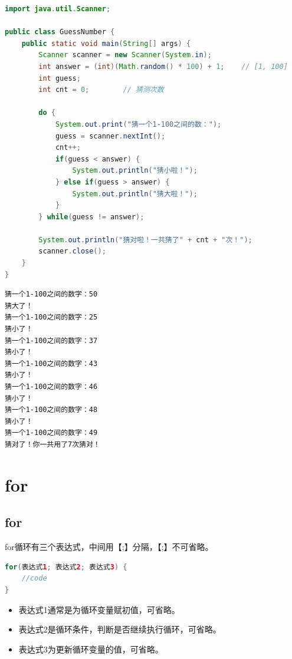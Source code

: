 
\begin{lstlisting}[language=Java]
import java.util.Scanner;

public class GuessNumber {
    public static void main(String[] args) {
        Scanner scanner = new Scanner(System.in);
        int answer = (int)(Math.random() * 100) + 1;    // [1, 100]
        int guess;
        int cnt = 0;        // 猜测次数
        
        do {
            System.out.print("猜一个1-100之间的数：");
            guess = scanner.nextInt();
            cnt++;
            if(guess < answer) {
                System.out.println("猜小啦！");
            } else if(guess > answer) {
                System.out.println("猜大啦！");
            }
        } while(guess != answer);
        
        System.out.println("猜对啦！一共猜了" + cnt + "次！");
        scanner.close();
    }
}
\end{lstlisting}

\begin{tcolorbox}
	\begin{verbatim}
猜一个1-100之间的数字：50
猜大了！
猜一个1-100之间的数字：25
猜小了！
猜一个1-100之间的数字：37
猜小了！
猜一个1-100之间的数字：43
猜小了！
猜一个1-100之间的数字：46
猜小了！
猜一个1-100之间的数字：48
猜小了！
猜一个1-100之间的数字：49
猜对了！你一共用了7次猜对！
    \end{verbatim}
\end{tcolorbox}

\newpage

\section{for}

\subsection{for}

for循环有三个表达式，中间用【;】分隔，【;】不可省略。

\vspace{-0.5cm}

\begin{lstlisting}[language=Java]
for(表达式1; 表达式2; 表达式3) {
    //code
}
\end{lstlisting}

\begin{itemize}
	\item 表达式1通常是为循环变量赋初值，可省略。
	\item 表达式2是循环条件，判断是否继续执行循环，可省略。
	\item 表达式3为更新循环变量的值，可省略。
\end{itemize}

